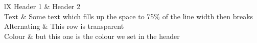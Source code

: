 \begin{RpgTable}[width=0.75\linewidth, color=green!30!white]{lX}
    Header 1 & Header 2
    \\
    Text & Some text which fills up the space to 75\% of the line width then breaks
	\\
	Alternating & This row is transparent
	\\
	Colour & but this one is the colour we set in the header
\end{RpgTable}
